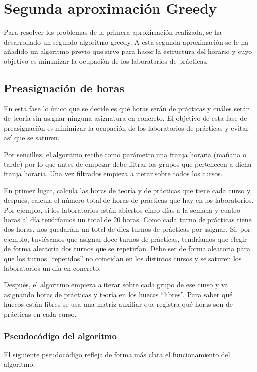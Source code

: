 \chapter{Segunda aproximación Greedy}
Para resolver los problemas de la primera aproximación realizada, se ha desarrollado un segundo algoritmo greedy. A esta segunda aproximación se le ha añadido un algoritmo previo que sirve para hacer la estructura del horario y cuyo objetivo es minimizar la ocupación de los laboratorios de prácticas.

\section{Preasignación de horas}
En esta fase lo único que se decide es qué horas serán de prácticas y cuáles serán de teoría sin asignar ninguna asignatura en concreto. El objetivo de esta fase de preasignación es minimizar la ocupación de los laboratorios de prácticas y evitar así que se saturen.

Por sencillez, el algoritmo recibe como parámetro una franja horaria (mañana o tarde) por lo que antes de empezar debe filtrar los grupos que pertenecen a dicha franja horaria. Una vez filtrados empieza a iterar sobre todos los cursos. 

En primer lugar, calcula las horas de teoría y de prácticas que tiene cada curso y, después, calcula el número total de horas de prácticas que hay en los laboratorios. Por ejemplo, si los laboratorios están abiertos cinco días a la semana y cuatro horas al día tendríamos un total de 20 horas. Como cada turno de prácticas tiene dos horas, nos quedarían un total de diez turnos de prácticas por asignar. Si, por ejemplo, tuviésemos que asignar doce turnos de prácticas, tendríamos que elegir de forma aleatoria dos turnos que se repetirían. Debe ser de forma aleatoria para que los turnos ``repetidos'' no coincidan en los distintos cursos y se saturen los laboratorios un día en concreto.

Después, el algoritmo empieza a iterar sobre cada grupo de ese curso y va asignando horas de prácticas y teoría en los huecos ``libres''. Para saber qué huecos están libres se usa una matriz auxiliar que registra qué horas son de prácticas en cada curso.

\subsection{Pseudocódigo del algoritmo}
El siguiente pseudocódigo refleja de forma más clara el funcionamiento del algoritmo.

